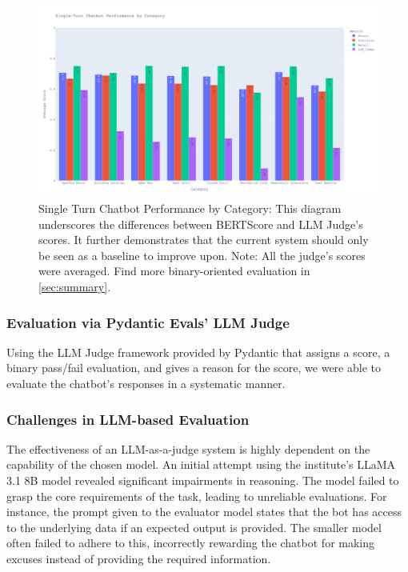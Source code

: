 \documentclass{article}
\begin{document}
\begin{figure}[htb]
    \centering
    \includegraphics[width=1.0\linewidth]{docs/phase2/plots/single_turn_performance_by_category.png}
    \caption{Single Turn Chatbot Performance by Category: This diagram underscores the differences between BERTScore and LLM Judge's scores. It further demonstrates that the current system should only be seen as a baseline to improve upon. Note: All the judge's scores were averaged. Find more binary-oriented evaluation in \cref{sec:summary}.}
    \label{fig:single_turn}
\end{figure}

\subsubsection{Evaluation via Pydantic Evals' LLM Judge}
Using the LLM Judge framework provided by Pydantic that assigns a score, a binary pass/fail evaluation, and gives a reason for the score, we were able to evaluate the chatbot's responses in a systematic manner.

\subsubsection*{Challenges in LLM-based Evaluation}
The effectiveness of an LLM-as-a-judge system is highly dependent on the capability of the chosen model. An initial attempt using the institute's LLaMA 3.1 8B model revealed significant impairments in reasoning. The model failed to grasp the core requirements of the task, leading to unreliable evaluations. For instance, the prompt given to the evaluator model states that the bot has access to the underlying data if an expected output is provided. The smaller model often failed to adhere to this, incorrectly rewarding the chatbot for making excuses instead of providing the required information.
\end{document}
